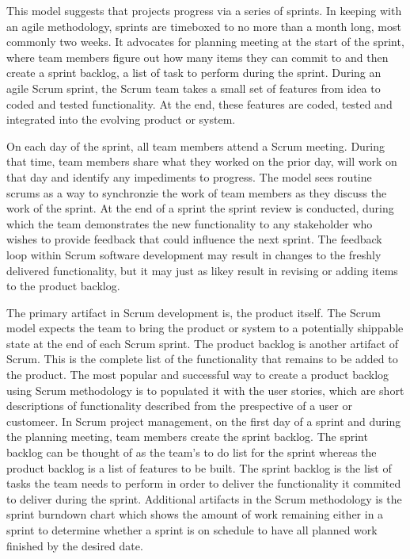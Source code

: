 This model suggests that projects progress via a series of sprints. In keeping with an agile methodology, sprints are timeboxed to no more than a month long, most commonly two weeks. It advocates for planning meeting at the start of the sprint, where team members figure out how many items they can commit to and then create a sprint backlog, a list of task to perform during the sprint. During an agile Scrum sprint, the Scrum team takes a small set of features from idea to coded and tested functionality. At the end, these features are coded, tested and integrated into the evolving product or system.

On each day of the sprint, all team members attend a Scrum meeting. During that time, team members share what they worked on the prior day, will work on that day and identify any impediments to progress. The model sees routine scrums as a way to synchronzie the work of team members as they discuss the work of the sprint. At the end of a sprint the sprint review is conducted, during which the team demonstrates the new functionality to any stakeholder who wishes to provide feedback that could influence the next sprint. The feedback loop within Scrum software development may result in changes to the freshly delivered functionality, but it may just as likey result in revising or adding items to the product backlog.

The primary artifact in Scrum development is, the product itself. The Scrum model expects the team to bring the product or system to a potentially shippable state at the end of each Scrum sprint. The product backlog is another artifact of Scrum. This is the complete list of the functionality that remains to be added to the product. The most popular and successful way to create a product backlog using Scrum methodology is to populated it with the user stories, which are short descriptions of functionality described from the prespective of a user or customeer. In Scrum project management, on the first day of a sprint and during the planning meeting, team members create the sprint backlog. The sprint backlog can be thought of as the team's to do list for the sprint whereas the product backlog is a list of features to be built. The sprint backlog is the list of tasks the team needs to perform in order to deliver the functionality it commited to deliver during the sprint. Additional artifacts in the Scrum methodology is the sprint burndown chart which shows the amount of work remaining either in a sprint to determine whether a sprint is on schedule to have all planned work finished by the desired date.

